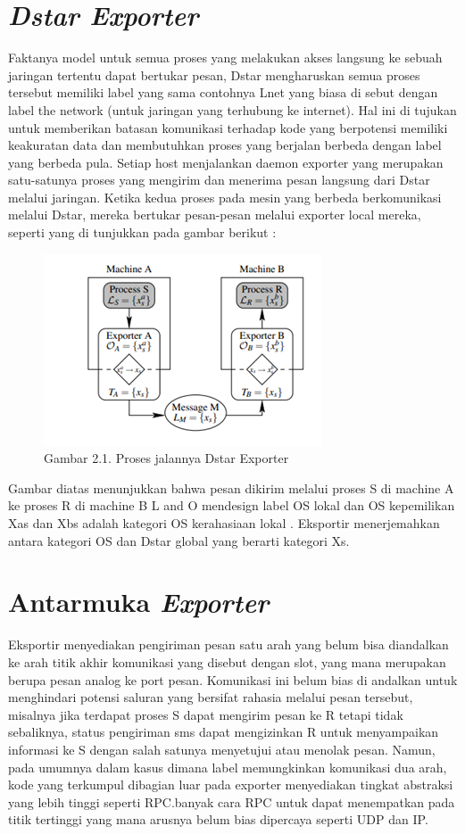 \documentclass{jtetiproposalskripsi}
\begin{document}
\section{\emph {Dstar Exporter}}
Faktanya  model untuk semua proses yang melakukan akses langsung ke sebuah jaringan tertentu dapat bertukar pesan, Dstar mengharuskan semua proses tersebut memiliki label yang sama contohnya Lnet  yang biasa di sebut dengan label the network (untuk jaringan yang terhubung ke internet). Hal ini di tujukan untuk memberikan batasan komunikasi terhadap kode yang berpotensi memiliki keakuratan data dan membutuhkan proses yang berjalan berbeda dengan label yang berbeda pula. Setiap host menjalankan daemon exporter yang merupakan satu-satunya proses yang mengirim dan menerima pesan langsung dari Dstar melalui jaringan. Ketika kedua proses pada mesin yang berbeda berkomunikasi melalui Dstar, mereka bertukar pesan-pesan melalui exporter local mereka, seperti yang di tunjukkan pada gambar berikut :




\begin{figure}[ht!]
  \centering
    \includegraphics{gambar/dstar}
    \caption{Gambar 2.1. Proses jalannya Dstar Exporter}
    \label{iqrf}
\end{figure}

Gambar diatas menunjukkan bahwa pesan dikirim melalui proses S di machine A ke proses R di machine B L and O mendesign label OS lokal dan OS kepemilikan Xas dan Xbs adalah kategori OS kerahasiaan lokal . Eksportir menerjemahkan antara kategori OS dan Dstar global yang berarti kategori Xs.

\section{Antarmuka \emph{Exporter}}
Eksportir menyediakan pengiriman pesan satu arah yang belum bisa diandalkan ke arah titik akhir komunikasi yang disebut dengan slot, yang mana merupakan berupa pesan analog ke port pesan. Komunikasi ini belum bias di andalkan untuk menghindari potensi saluran yang bersifat rahasia melalui pesan tersebut, misalnya jika terdapat proses S dapat mengirim pesan ke R tetapi tidak sebaliknya, status pengiriman sms dapat mengizinkan R untuk menyampaikan informasi ke S dengan salah satunya menyetujui atau menolak pesan. Namun, pada umumnya dalam kasus dimana label memungkinkan komunikasi dua arah, kode yang terkumpul dibagian luar pada exporter menyediakan tingkat abstraksi yang lebih tinggi seperti RPC.banyak cara RPC untuk dapat menempatkan pada titik tertinggi yang mana arusnya belum bias dipercaya seperti UDP dan IP.
\end{document}
